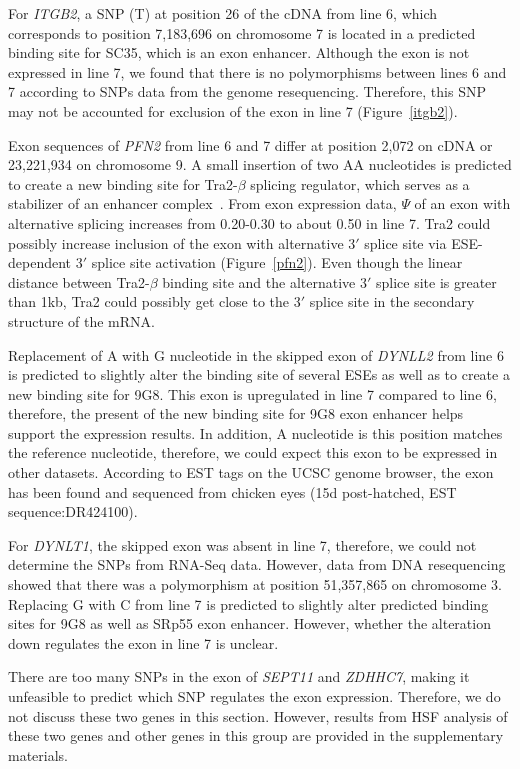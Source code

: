 \documentclass[10pt]{article}
\begin{document}
For \textit{ITGB2}, a SNP (T) at position 26 of the cDNA from line 6, which corresponds to
position 7,183,696 on chromosome 7 is located in a predicted binding site for
SC35, which is an exon enhancer.
Although the exon is not expressed in line 7, we found that there is no polymorphisms between
lines 6 and 7 according to SNPs data from the genome resequencing.
Therefore, this SNP may not be accounted for exclusion of the exon in
line 7 (Figure~\ref{itgb2}).

Exon sequences of \textit{PFN2} from line 6 and 7 differ at position 2,072 on
cDNA or 23,221,934 on chromosome 9.
A small insertion of two AA nucleotides is predicted to create a new binding site
for Tra2-$\beta$ splicing regulator, which serves as a stabilizer of an enhancer
complex~\cite{lopez1998alternative}.
From exon expression data, $\Psi$ of an exon with alternative splicing increases
from 0.20-0.30 to about 0.50 in line 7.
Tra2 could possibly increase inclusion of the exon with alternative 3$\prime$ splice site via
ESE-dependent 3$\prime$ splice site activation (Figure~\ref{pfn2}).
Even though the linear distance between Tra2-$\beta$ binding site and the alternative
3$\prime$ splice site is greater than 1kb, Tra2 could possibly get close to
the 3$\prime$ splice site in the secondary structure of the mRNA.

Replacement of A with G nucleotide in the skipped exon of \textit{DYNLL2} from line 6
is predicted to slightly alter the binding site of several ESEs as well as to create
a new binding site for 9G8.
This exon is upregulated in line 7 compared to line 6, therefore, the present
of the new binding site for 9G8 exon enhancer helps support the expression results.
In addition, A nucleotide is this position matches the reference
nucleotide, therefore, we could expect this exon to be expressed in other datasets.
According to EST tags on the UCSC genome browser, the exon has been found and sequenced
from chicken eyes (15d post-hatched, EST sequence:DR424100).

For \textit{DYNLT1}, the skipped exon was absent in line 7, therefore, we could not
determine the SNPs from RNA-Seq data.
However, data from DNA resequencing showed that there was a polymorphism at position
51,357,865 on chromosome 3.
Replacing G with C from line 7 is predicted to slightly alter predicted binding sites
for 9G8 as well as SRp55 exon enhancer.
However, whether the alteration down regulates the exon in line 7 is unclear.

There are too many SNPs in the exon of \textit{SEPT11} and \textit{ZDHHC7}, making it
unfeasible to predict which SNP regulates the exon expression.
Therefore, we do not discuss these two genes in this section.
However, results from HSF analysis of these two genes and
other genes in this group are provided in the supplementary materials.
\end{document}
